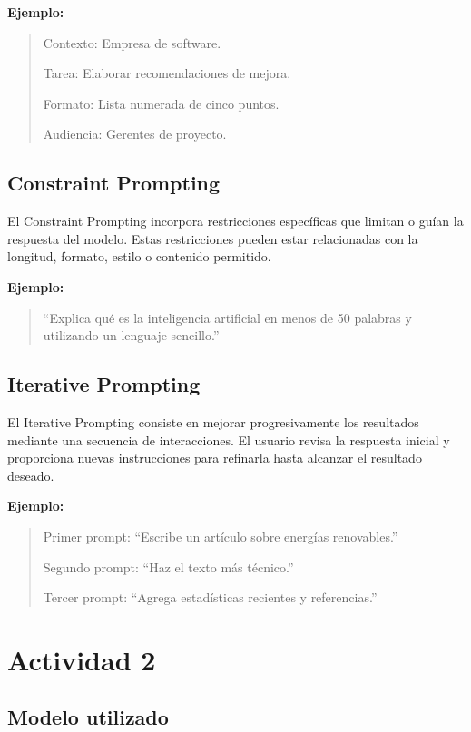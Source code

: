 \documentclass[12pt,a4paper]{article}
\begin{document}
\textbf{Ejemplo:}

\begin{quote}
Contexto: Empresa de software.

Tarea: Elaborar recomendaciones de mejora.

Formato: Lista numerada de cinco puntos.

Audiencia: Gerentes de proyecto.
\end{quote}

\subsection{Constraint Prompting}

El Constraint Prompting incorpora restricciones específicas que limitan o guían la respuesta del modelo. Estas restricciones pueden estar relacionadas con la longitud, formato, estilo o contenido permitido.

\textbf{Ejemplo:}

\begin{quote}
``Explica qué es la inteligencia artificial en menos de 50 palabras y utilizando un lenguaje sencillo.''
\end{quote}

\subsection{Iterative Prompting}

El Iterative Prompting consiste en mejorar progresivamente los resultados mediante una secuencia de interacciones. El usuario revisa la respuesta inicial y proporciona nuevas instrucciones para refinarla hasta alcanzar el resultado deseado.

\textbf{Ejemplo:}

\begin{quote}
Primer prompt: ``Escribe un artículo sobre energías renovables.''

Segundo prompt: ``Haz el texto más técnico.''

Tercer prompt: ``Agrega estadísticas recientes y referencias.''
\end{quote}

\section{Actividad 2}

\subsection{Modelo utilizado}
\end{document}
